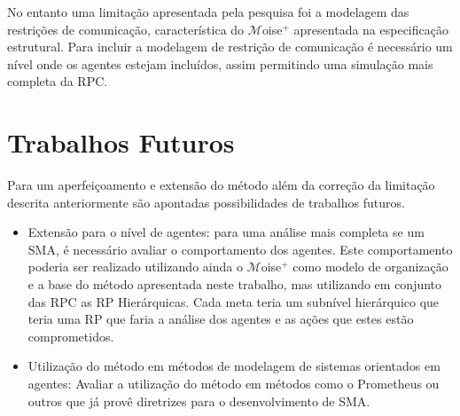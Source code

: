 No entanto uma limitação apresentada pela pesquisa foi a modelagem das restrições de comunicação, característica do  $\mathcal{M}$oise$^{+}$ apresentada na especificação estrutural. Para incluir a modelagem de restrição de comunicação é necessário um nível onde os agentes estejam incluídos, assim permitindo uma simulação mais completa da RPC.

\section{Trabalhos Futuros}

Para um aperfeiçoamento e extensão do método além da correção da limitação descrita anteriormente são apontadas  possibilidades de trabalhos futuros.

\begin{itemize}
\item Extensão para o nível de agentes: para uma análise mais completa se um SMA, é necessário avaliar o comportamento dos agentes. Este comportamento poderia ser realizado utilizando ainda o $\mathcal{M}$oise$^{+}$ como modelo de organização e a base do método apresentada neste trabalho, mas utilizando em conjunto das RPC as RP Hierárquicas. Cada meta teria um subnível hierárquico que teria uma RP que faria a análise dos agentes e as ações que estes estão comprometidos.

\item Utilização do método em métodos de modelagem de sistemas orientados em agentes: Avaliar a utilização do método em métodos como o Prometheus ou outros que já provê diretrizes para o desenvolvimento de SMA.
\end{itemize}

